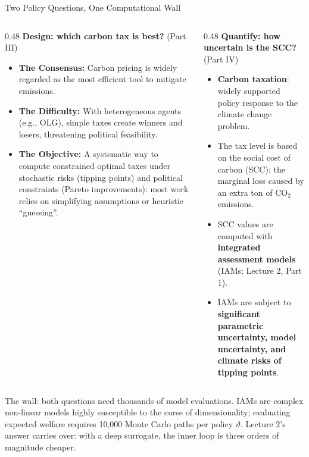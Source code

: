 \documentclass[aspectratio=169,11pt]{beamer}
\newcommand{\emphc}[1]{\textcolor{harvardcrimson}{#1}}
\newcommand{\key}[1]{\textbf{\textcolor{uzhblue}{#1}}}
\newcommand{\keyc}[1]{\textcolor{uzhblue}{#1}}
\begin{document}
\begin{frame}{Two Policy Questions, One Computational Wall}
\footnotesize
\begin{columns}[t]
\begin{column}{0.48\textwidth}
\textbf{Design: which carbon tax is best?} {\tiny (Part III)}
\begin{itemize}\itemsep1pt
  \item \textbf{The Consensus:} Carbon pricing is widely regarded as the most efficient tool to mitigate emissions.
  \item \textbf{The Difficulty:} With heterogeneous agents (e.g., OLG), simple taxes create winners and losers, threatening political feasibility.
  \item \textbf{The Objective:} A systematic way to compute \keyc{constrained optimal taxes} under stochastic risks (tipping points) and political constraints (Pareto improvements): most work relies on \keyc{simplifying assumptions} or heuristic ``guessing''.
\end{itemize}
\end{column}
\begin{column}{0.48\textwidth}
\textbf{Quantify: how uncertain is the SCC?} {\tiny (Part IV)}
\begin{itemize}\itemsep1pt
  \item \key{Carbon taxation}: widely supported policy response to the climate change problem.
  \item The tax level is based on the social cost of carbon (SCC): the marginal loss caused by an extra ton of CO$_2$ emissions.
  \item SCC values are computed with \key{integrated assessment models} (IAMs; Lecture 2, Part 1).
  \item IAMs are subject to \key{significant parametric uncertainty, model uncertainty, and climate risks of tipping points}.
\end{itemize}
\end{column}
\end{columns}
\vspace{0.4em}
{\scriptsize \emphc{The wall:} both questions need thousands of model evaluations. IAMs are complex non-linear models highly susceptible to the curse of dimensionality; evaluating expected welfare requires 10{,}000 Monte Carlo paths per policy $\vartheta$. Lecture 2's answer carries over: with a deep surrogate, the inner loop is three orders of magnitude cheaper.}
\end{frame}
\end{document}
